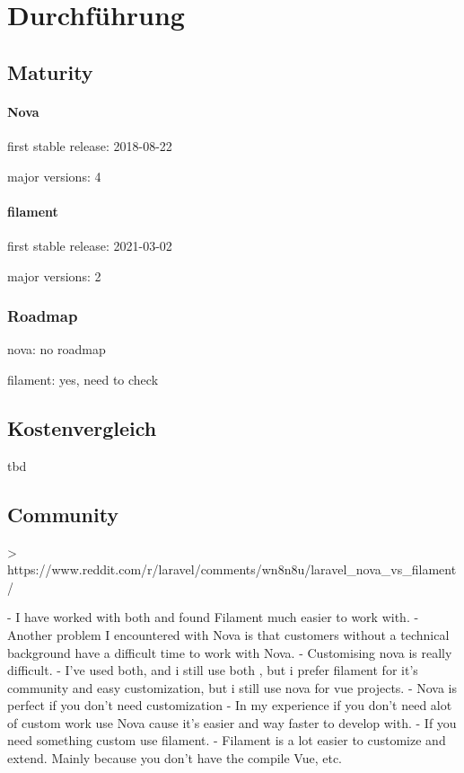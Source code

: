 \section{Durchführung}

\subsection{Maturity}

\paragraph{Nova}
first stable release: 2018-08-22

major versions: 4

\paragraph{filament}
first stable release: 2021-03-02

major versions: 2

\subsubsection{Roadmap}
nova: no roadmap

filament: yes, need to check

\subsection{Kostenvergleich}
tbd

\subsection{Community}
> https://www.reddit.com/r/laravel/comments/wn8n8u/laravel_nova_vs_filament/

- I have worked with both and found Filament much easier to work with.
- Another problem I encountered with Nova is that customers without a technical background have a difficult time to work
with Nova.
- Customising nova is really difficult.
- I've used both, and i still use both , but i prefer filament for it's community and easy customization, but i still
use nova for vue projects.
- Nova is perfect if you don't need customization
- In my experience if you don’t need alot of custom work use Nova cause it’s easier and way faster to develop with.
- If you need something custom use filament.
- Filament is a lot easier to customize and extend. Mainly because you don’t have the compile Vue, etc.

